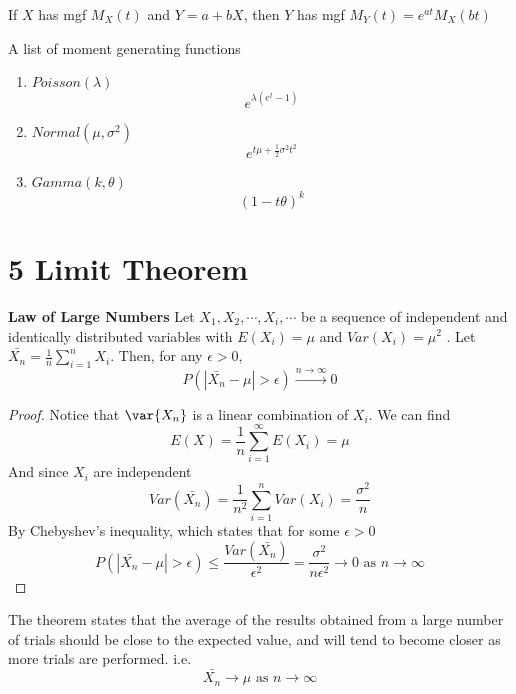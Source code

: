 \documentclass[11pt]{article}
\begin{document}
\begin{proposition*}
  If $X$ has mgf $M_X(t)$ and $Y = a+bX$, then $Y$ has mgf $M_Y(t) = e^{at}M_X(bt)$
\end{proposition*}

\begin{defn*}
  A list of moment generating functions

  \begin{enumerate}
    \item $Poisson(\lambda)$
    \[
      e^{\lambda (e^t -1)}
    \]
    \item $Normal(\mu, \sigma^2)$
    \[
      e^{t\mu + \frac{1}{2}\sigma^2t^2}
    \]
    \item $Gamma(k, \theta)$
    \[
      (1 - t\theta)^k
    \]
  \end{enumerate}

\end{defn*}


\section*{5 Limit Theorem}

\begin{theorem*}
  \label{law of large numbers}
  \textbf{Law of Large Numbers} Let $X_1, X_2, \cdots, X_i, \cdots$ be a sequence of independent and identically distributed variables with $E(X_i) = \mu$ and $Var(X_i) = \mu^2$ . Let $\bar{X_n} = \frac{1}{n}\sum_{i=1}^{n} X_i$. Then,  for any $
  \epsilon > 0$,
  \[
    P(|\bar{X_n} - \mu| > \epsilon) \xrightarrow{n\to \infty} 0
  \]
  \begin{proof}
    Notice that $\var{X_n}$ is a linear combination of $X_i$. We can find
    \[
      E(X) = \frac{1}{n}\sum_{i=1}^{\infty} E(X_i) = \mu
    \]
    And since $X_i$ are independent
    \[
      Var(\bar{X_n}) = \frac{1}{n^2} \sum_{i=1}^{n} Var(X_i) = \frac{\sigma^2}{n}
    \]
    By Chebyshev's inequality, which states that for some $\epsilon > 0$
    \[
      P(|\bar{X_n}-\mu| > \epsilon) \leq \frac{Var(\bar{X_n})}{\epsilon^2} = \frac{\sigma^2}{n\epsilon^2} \to 0 \text{  as }n\to\infty
    \]
  \end{proof}
  \begin{rem}
    The theorem states that the average of the results obtained from a large number of trials should be close to the expected value, and will tend to become closer as more trials are performed. i.e.
    \[
      \bar{X_n} \to \mu \text{ as } n\to\infty
    \]
  \end{rem}

\end{theorem*}
\end{document}
